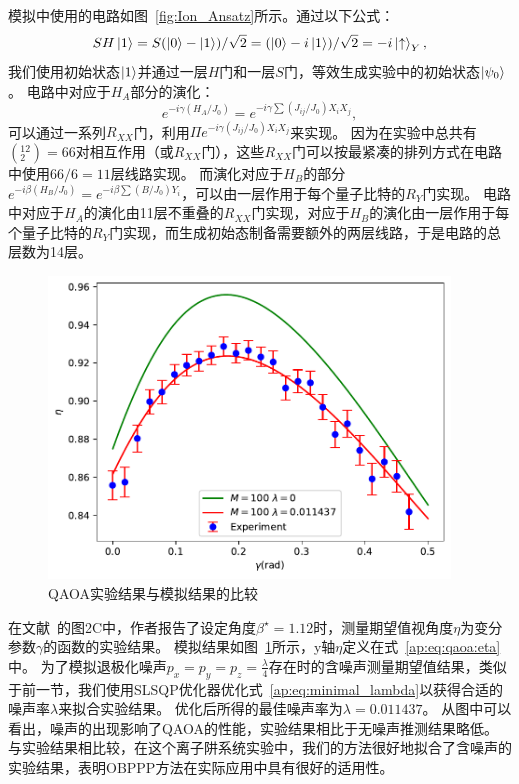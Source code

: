     模拟中使用的电路如图~\ref{fig:Ion_Ansatz}所示。通过以下公式：
    \begin{equation}
        SH\ket{1}=S(\ket{0}-\ket{1})/\sqrt{2}=(\ket{0}-i\ket{1})/\sqrt{2}=-i\ket{\uparrow}_Y,
    \end{equation}
    我们使用初始状态$\ket{1}$并通过一层$H$门和一层$S$门，等效生成实验中的初始状态$\ket{\psi_0}$。
    电路中对应于$H_A$部分的演化：
    \begin{equation}
        e^{-i\gamma (H_A/J_0)}=e^{-i\gamma \sum (J_{ij}/J_0)X_iX_j},
    \end{equation}
    可以通过一系列$R_{XX}$门，利用$\Pi e^{-i\gamma(J_{ij}/J_0)X_iX_j}$来实现。
    因为在实验中总共有$(^{12}_2)=66$对相互作用（或$R_{XX}$门），这些$R_{XX}$门可以按最紧凑的排列方式在电路中使用$66/6=11$层线路实现。
    而演化对应于$H_B$的部分$e^{-i\beta (H_B/J_0)}=e^{-i\beta \sum(B/J_0)Y_i}$，可以由一层作用于每个量子比特的$R_Y$门实现。
    电路中对应于$H_A$的演化由11层不重叠的$R_{XX}$门实现，对应于$H_B$的演化由一层作用于每个量子比特的$R_Y$门实现，而生成初始态制备需要额外的两层线路，于是电路的总层数为14层。
    
    \begin{figure}[htbp]
        \centering
        \includegraphics[width=0.95\textwidth]{figures/QAOA.pdf}
        \caption{QAOA实验结果与模拟结果的比较}\label{fig:QAOA_result}
    \end{figure}
    
    在文献~\cite{pagano2020quantum}的图2C中，作者报告了设定角度$\beta^\star=1.12$时，测量期望值视角度$\eta$为变分参数$\gamma$的函数的实验结果。
    模拟结果如图~\ref{fig:QAOA_result}所示，y轴$\eta$定义在式~\ref{ap:eq:qaoa:eta}中。
    为了模拟退极化噪声$p_x = p_y = p_z = \frac{\lambda}{4}$存在时的含噪声测量期望值结果，类似于前一节，我们使用SLSQP优化器优化式~\ref{ap:eq:minimal_lambda}以获得合适的噪声率$\lambda$来拟合实验结果。
    优化后所得的最佳噪声率为$\lambda=0.011437$。
    从图中可以看出，噪声的出现影响了QAOA的性能，实验结果相比于无噪声推测结果略低。
    与实验结果相比较，在这个离子阱系统实验中，我们的方法很好地拟合了含噪声的实验结果，表明OBPPP方法在实际应用中具有很好的适用性。